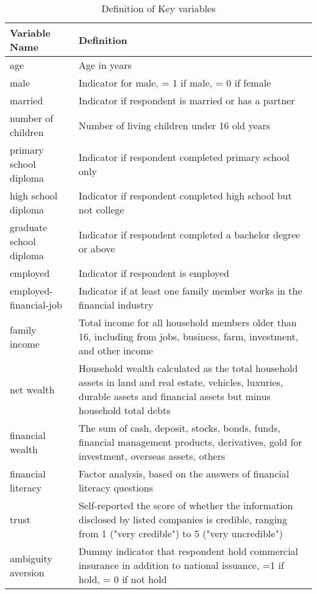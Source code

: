 \documentclass[ukenglish,nottitlepage,thmsb,11pt,letterpaper]{article}
\begin{document}
\begin{spacing}{1}
\begin{table}[H]
	\renewcommand\arraystretch{1.65}%
	\centering
	\caption{Definition of Key variables}
	\small
	\begin{tabular}{L{4.25cm}L{12.25cm}}
		\toprule
		Variable Name   & Definition \\
		\midrule
		age       & Age in years \\
		male      & Indicator for male,  = 1 if male, = 0 if female  \\
		
		married   & Indicator if respondent is married or has a     partner  \\
		number of children     & Number of living children under 16 old years\\
		primary school diploma & Indicator if respondent completed primary school only \\
		high school diploma     & Indicator if respondent completed high school but not college \\
		graduate school diploma & Indicator if respondent completed a bachelor degree or above \\
		employed                & Indicator if respondent is employed \\
		employed-financial-job  & Indicator if at least one family member works in the financial industry \\
		family income           & Total income for all household members older than 16, including from jobs, business, farm, investment, and other income \\
		net wealth   &   Household wealth calculated as the total household assets in land and real estate, vehicles, luxuries, durable assets and financial assets but minus household total debts \\
		financial wealth  & The sum of cash, deposit, stocks, bonds, funds, financial management products, derivatives, gold for investment, overseas assets, others  \\
		financial literacy  & Factor analysis, based on the answers of financial literacy questions \\
		trust   & Self-reported the score of whether the information disclosed by listed companies is credible, ranging from 1 ("very credible") to 5 ("very uncredible") \\
		ambiguity aversion  & Dummy indicator that respondent hold commercial insurance in addition to national issuance, =1 if hold, = 0 if not hold \\

\end{tabular}
\end{table}
\end{spacing}
\end{document}
